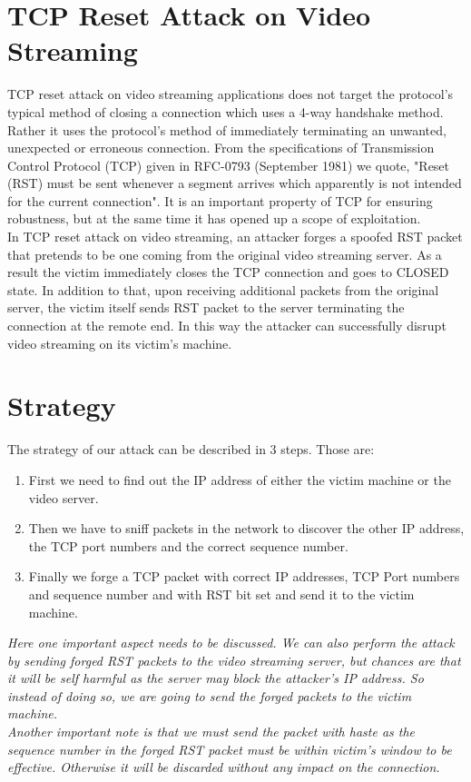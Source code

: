 \documentclass[14pt]{extarticle}
\begin{document}
\section{TCP Reset Attack on Video Streaming}
    TCP reset attack on video streaming applications does not target the protocol's typical method of closing a connection which uses a 4-way handshake method. Rather it uses the protocol's method of immediately terminating an unwanted, unexpected or erroneous connection. From the specifications of Transmission Control Protocol (TCP) given in RFC-0793 (September 1981) we quote, "Reset (RST) must be sent whenever a segment arrives which apparently is not intended for the current connection". It is an important property of TCP for ensuring robustness, but at the same time it has opened up a scope of exploitation. \\ 
    In TCP reset attack on video streaming, an attacker forges a spoofed RST packet that pretends to be one coming from the original video streaming server. As a result the victim immediately closes the TCP connection and goes to CLOSED state. In addition to that, upon receiving additional packets from the original server, the victim itself sends RST packet to the server terminating the connection at the remote end. In this way the attacker can successfully disrupt video streaming on its victim's machine.

\section{Strategy}
   
    The  strategy of our attack can be described in 3 steps. Those are:
    \begin{enumerate}
      \item First we need to find out the IP address of either the victim machine or the video server.
      \item Then we have to sniff packets in the network to discover the other IP address, the TCP port numbers and the correct sequence number.
      \item Finally we forge a TCP packet with correct IP addresses, TCP Port numbers and sequence number and with RST bit set and send it to the victim machine.
    \end{enumerate}
    
     \label{sec:strategy}
    
    \textsl{Here one important aspect needs to be discussed. We can also perform the attack by sending forged RST packets to the video streaming server, but chances are that it will be self harmful as the server may block the attacker's IP address. So instead of doing so, we are going to send the forged packets to the victim machine.}  \\
    \textsl{Another important note is that we must send the packet with haste as the sequence number in the forged RST packet must be within victim's window to  be effective. Otherwise it will be discarded without any impact on the connection.}
  
\end{document}
